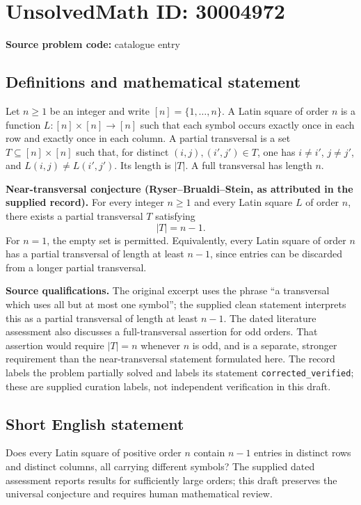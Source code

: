 \documentclass[11pt]{article}
\begin{document}
\section*{UnsolvedMath ID: 30004972}
\textbf{Source problem code:} catalogue entry
\subsection{Definitions and mathematical statement}
Let \(n\geq 1\) be an integer and write \([n]=\{1,\ldots,n\}\). A Latin square of order \(n\) is a function \(L:[n]\times[n]\to[n]\) such that each symbol occurs exactly once in each row and exactly once in each column. A partial transversal is a set \(T\subseteq[n]\times[n]\) such that, for distinct \((i,j),(i',j')\in T\), one has \(i\neq i'\), \(j\neq j'\), and \(L(i,j)\neq L(i',j')\). Its length is \(|T|\). A full transversal has length \(n\).

\textbf{Near-transversal conjecture (Ryser--Brualdi--Stein, as attributed in the supplied record).} For every integer \(n\geq1\) and every Latin square \(L\) of order \(n\), there exists a partial transversal \(T\) satisfying
\[
|T|=n-1.
\]
For \(n=1\), the empty set is permitted. Equivalently, every Latin square of order \(n\) has a partial transversal of length at least \(n-1\), since entries can be discarded from a longer partial transversal.

\textbf{Source qualifications.} The original excerpt uses the phrase ``a transversal which uses all but at most one symbol''; the supplied clean statement interprets this as a partial transversal of length at least \(n-1\). The dated literature assessment also discusses a full-transversal assertion for odd orders. That assertion would require \(|T|=n\) whenever \(n\) is odd, and is a separate, stronger requirement than the near-transversal statement formulated here. The record labels the problem partially solved and labels its statement \texttt{corrected\_verified}; these are supplied curation labels, not independent verification in this draft.
\subsection{Short English statement}
Does every Latin square of positive order \(n\) contain \(n-1\) entries in distinct rows and distinct columns, all carrying different symbols? The supplied dated assessment reports results for sufficiently large orders; this draft preserves the universal conjecture and requires human mathematical review.
\end{document}
